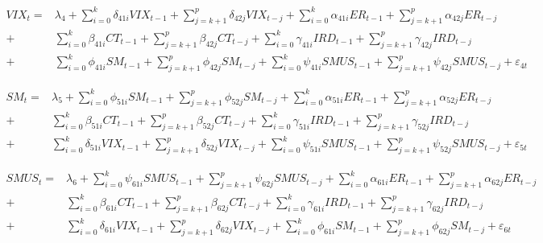\documentclass[a4paper, twoside]{templates/ociamthesis}
\begin{document}
\begingroup\small

\begin{equation}
  \begin{aligned}
VIX_t 
= & \lambda_4 + \sum_{i=0}^k\delta_{41i}VIX_{t-1} + \sum_{j=k+1}^p\delta_{42j}VIX_{t-j} + \sum_{i=0}^k\alpha_{41i}ER_{t-1} + \sum_{j=k+1}^p\alpha_{42j}ER_{t-j} \\
+ & \sum_{i=0}^k\beta_{41i}CT_{t-1} + \sum_{j=k+1}^p\beta_{42j}CT_{t-j} + \sum_{i=0}^k\gamma_{41i}IRD_{t-1} + \sum_{j=k+1}^p\gamma_{42j}IRD_{t-j} \\
+ & \sum_{i=0}^k\phi_{41i}SM_{t-1} + \sum_{j=k+1}^p\phi_{42j}SM_{t-j} + \sum_{i=0}^k\psi_{41i}SMUS_{t-1} + \sum_{j=k+1}^p\psi_{42j}SMUS_{t-j} +\varepsilon_{4t}
  \end{aligned}
\label{eq:b4}
\end{equation}
\endgroup

\begingroup\small

\begin{equation}
  \begin{aligned}
SM_t 
= & \lambda_5 + \sum_{i=0}^k\phi_{51i}SM_{t-1} + \sum_{j=k+1}^p\phi_{52j}SM_{t-j} + \sum_{i=0}^k\alpha_{51i}ER_{t-1} + \sum_{j=k+1}^p\alpha_{52j}ER_{t-j} \\
+ & \sum_{i=0}^k\beta_{51i}CT_{t-1} + \sum_{j=k+1}^p\beta_{52j}CT_{t-j} + \sum_{i=0}^k\gamma_{51i}IRD_{t-1} + \sum_{j=k+1}^p\gamma_{52j}IRD_{t-j} \\
+ & \sum_{i=0}^k\delta_{51i}VIX_{t-1} + \sum_{j=k+1}^p\delta_{52j}VIX_{t-j} + \sum_{i=0}^k\psi_{51i}SMUS_{t-1} + \sum_{j=k+1}^p\psi_{52j}SMUS_{t-j} +\varepsilon_{5t}
  \end{aligned}
\label{eq:b5}
\end{equation}
\endgroup

\begingroup\small

\begin{equation}
  \begin{aligned}
SMUS_t 
= & \lambda_6 + \sum_{i=0}^k\psi_{61i}SMUS_{t-1} + \sum_{j=k+1}^p\psi_{62j}SMUS_{t-j} + \sum_{i=0}^k\alpha_{61i}ER_{t-1} + \sum_{j=k+1}^p\alpha_{62j}ER_{t-j} \\
+ & \sum_{i=0}^k\beta_{61i}CT_{t-1} + \sum_{j=k+1}^p\beta_{62j}CT_{t-j} + \sum_{i=0}^k\gamma_{61i}IRD_{t-1} + \sum_{j=k+1}^p\gamma_{62j}IRD_{t-j} \\
+ & \sum_{i=0}^k\delta_{61i}VIX_{t-1} + \sum_{j=k+1}^p\delta_{62j}VIX_{t-j} + \sum_{i=0}^k\phi_{61i}SM_{t-1} + \sum_{j=k+1}^p\phi_{62j}SM_{t-j} +\varepsilon_{6t}
  \end{aligned}
\label{eq:b6}
\end{equation}
\endgroup
\end{document}
